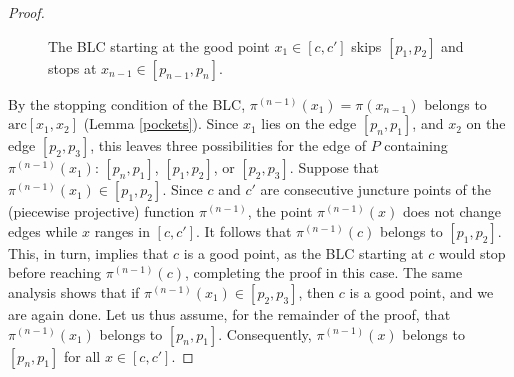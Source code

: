 \documentclass[11pt]{amsart}
\theoremstyle{remark}
\numberwithin{equation}{section}
\newcommand{\arc}{\mathrm{arc}}
\begin{document}
\begin{proof}
\begin{figure}[h]
\centering


\caption{The BLC starting at the good point $x_1\in [c,c']$ skips $[p_1,p_2]$ and stops at $x_{n-1}\in [p_{n-1},p_n]$.}
\end{figure}


By the stopping condition of the BLC, $\pi^{(n-1)}(x_1)=\pi(x_{n-1})$ belongs to $\arc[x_1,x_2]$ (Lemma \ref{pockets}). Since $x_1$ lies on the edge $[p_n,p_1]$, and $x_2$ on the edge $[p_2,p_3]$, this leaves three possibilities for the edge of $P$ containing $\pi^{(n-1)}(x_1)$: $[p_n,p_1]$, $[p_1,p_2]$, or $[p_2,p_3]$. 
Suppose that $\pi^{(n-1)}(x_1)\in [p_1,p_2]$. Since $c$ and $c'$ are consecutive juncture points of the (piecewise projective) function $\pi^{(n-1)}$, 
the point $\pi^{(n-1)}(x)$ does not change edges while  $x$ ranges in $[c,c']$. It follows that  $\pi^{(n-1)}(c)$ belongs to $[p_1,p_2]$.
This, in turn, implies that $c$ is a good point, as the BLC starting at $c$ would stop before reaching $\pi^{(n-1)}(c)$, 
  completing the proof in this case. The same analysis shows that if   $\pi^{(n-1)}(x_1)\in [p_2,p_3]$, then
$c$ is a good point, and we are again done. Let us thus assume, for the remainder of the proof, that $\pi^{(n-1)}(x_1)$ belongs to $[p_n,p_1]$. Consequently, 
$\pi^{(n-1)}(x)$ belongs to $[p_n,p_1]$ for all $x\in [c,c']$.




\end{proof}
\end{document}
